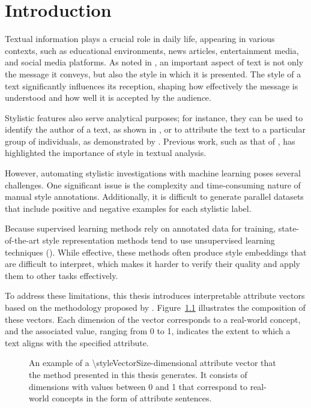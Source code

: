 \chapter{Introduction}
\label{sec:introduction}
Textual information plays a crucial role in daily life, appearing in various contexts, such as educational environments, news articles, entertainment media, and social media platforms. As noted in \citet{wegmannSameAuthorJust2022}, an important aspect of text is not only the message it conveys, but also the style in which it is presented. The style of a text significantly influences its reception, shaping how effectively the message is understood and how well it is accepted by the audience.

Stylistic features also serve analytical purposes; for instance, they can be used to identify the author of a text, as shown in \citet{alshomaryLatentSpaceInterpretation2024}, or to attribute the text to a particular group of individuals, as demonstrated by \citet{10.1007/978-3-642-29047-3_27}. Previous work, such as that of \citet{zhu-etal-2024-styleflow, ijcai2020p526, wegmannSameAuthorJust2022}, has highlighted the importance of style in textual analysis.

However, automating stylistic investigations with machine learning poses several challenges. One significant issue is the complexity and time-consuming nature of manual style annotations. Additionally, it is difficult to generate parallel datasets that include positive and negative examples for each stylistic label.

Because supervised learning methods rely on annotated data for training, state-of-the-art style representation methods tend to use unsupervised learning techniques (\cite{jin-etal-2022-deep}).
While effective, these methods often produce style embeddings that are difficult to interpret, which makes it harder to verify their quality and apply them to other tasks effectively.

To address these limitations, this thesis introduces interpretable attribute vectors based on the methodology proposed by \citet{patelLearningInterpretableStyle2023}. Figure~\ref{fig:attributeVector} illustrates the composition of these vectors. Each dimension of the vector corresponds to a real-world concept, and the associated value, ranging from \num{0} to \num{1}, indicates the extent to which a text aligns with the specified attribute.

\begin{figure}[ht]
      \begin{center}
            
            \caption{An example of a \num{\styleVectorSize}-dimensional attribute vector that the method presented in this thesis generates. It consists of dimensions with values between \num{0} and \num{1} that correspond to real-world concepts in the form of attribute sentences.}%
            \label{fig:attributeVector}
      \end{center}
\end{figure}

